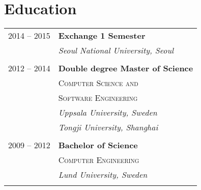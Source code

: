 \documentclass[10pt]{article} %
\begin{document}
{\begin{minipage}[t]{0.44\textwidth}

%
%


\section{Education}

\begin{tabular}{rl} %


2014 -- \textsc{2015} & \textbf{Exchange 1 Semester} \\
& \textit{Seoul National University, Seoul}\\
&\\


2012 -- \textsc{2014} & \textbf{Double degree Master of Science} \\
& \textsc{Computer Science and} \\
& \textsc{Software Engineering} \\
& \textit{Uppsala University, Sweden} \\
& \textit{Tongji University, Shanghai} \\
&\\


2009 -- 2012 & \textbf{Bachelor of Science} \\
& \textsc{Computer Engineering} \\
& \textit{Lund University, Sweden}\\
&\\


\end{tabular}
\end{minipage}}
\end{document}
